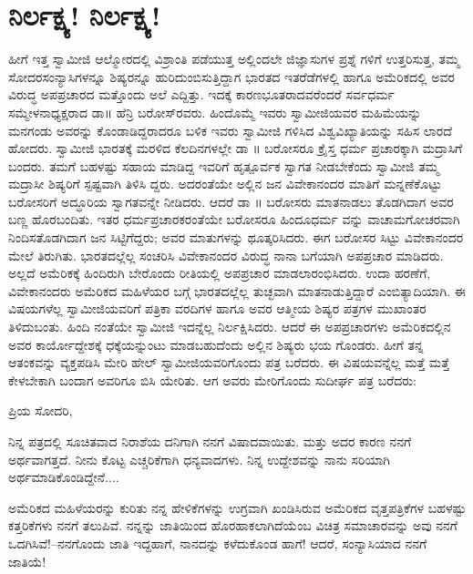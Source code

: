 
\chapter{ನಿರ್ಲಕ್ಷ್ಯ! ನಿರ್ಲಕ್ಷ್ಯ!}

\noindent

ಹೀಗೆ ಇತ್ತ ಸ್ವಾಮೀಜಿ ಆಲ್ಮೋರದಲ್ಲಿ ವಿಶ್ರಾಂತಿ ಪಡೆಯುತ್ತ ಅಲ್ಲಿಂದಲೇ ಜಿಜ್ಞಾಸುಗಳ ಪ್ರಶ್ನೆ ಗಳಿಗೆ ಉತ್ತರಿಸುತ್ತ, ತಮ್ಮ ಸೋದರಸಂನ್ಯಾಸಿಗಳನ್ನೂ ಶಿಷ್ಯರನ್ನೂ ಹುರಿದುಂಬಿಸುತ್ತಿದ್ದಾಗ ಭಾರತದ ಇತರೆಡೆಗಳಲ್ಲಿ ಹಾಗೂ ಅಮೆರಿಕದಲ್ಲಿ ಅವರ ವಿರುದ್ಧ ಅಪಪ್ರಚಾರದ ಮತ್ತೊಂದು ಅಲೆ ಎದ್ದಿತ್ತು. ಇದಕ್ಕೆ ಕಾರಣಭೂತರಾದವರೆಂದರೆ ಸರ್ವಧರ್ಮ ಸಮ್ಮೇಳನಾಧ್ಯಕ್ಷರಾದ ಡಾ॥ ಹೆನ್ರಿ ಬರೋಸ್​ರವರು. ಹಿಂದೊಮ್ಮೆ ಇವರು ಸ್ವಾಮೀಜಿಯವರ ಮಹಿಮೆಯನ್ನು ಮನಗಂಡು ಅವರನ್ನು ಕೊಂಡಾಡಿದ್ದರಾದರೂ ಬಳಿಕ ಇವರು ಸ್ವಾಮೀಜಿ ಗಳಿಸಿದ ವಿಶ್ವವಿಖ್ಯಾತಿಯನ್ನು ಸಹಿಸ ಲಾರದೆ ಹೋದರು. ಸ್ವಾಮೀಜಿ ಭಾರತಕ್ಕೆ ಮರಳಿದ ಕೆಲದಿನಗಳಲ್ಲೇ ಡಾ ॥ ಬರೋಸರೂ ಕ್ರೈಸ್ತ ಧರ್ಮ ಪ್ರಚಾರಕ್ಕಾಗಿ ಮದ್ರಾಸಿಗೆ ಬಂದರು. ತಮಗೆ ಬಹಳಷ್ಟು ಸಹಾಯ ಮಾಡಿದ್ದ ಇವರಿಗೆ ಹೃತ್ಪೂರ್ವಕ ಸ್ವಾಗತ ನೀಡಬೇಕೆಂದು ಸ್ವಾಮೀಜಿ ತಮ್ಮ ಮದ್ರಾಸೀ ಶಿಷ್ಯರಿಗೆ ಸ್ಪಷ್ಟವಾಗಿ ತಿಳಿಸಿ ದ್ದರು. ಅದರಂತೆಯೇ ಅಲ್ಲಿನ ಜನ ವಿವೇಕಾನಂದರ ಮಾತಿಗೆ ಮನ್ನಣೆಕೊಟ್ಟು ಬರೋಸರಿಗೆ ಅದ್ಧೂರಿಯ ಸ್ವಾಗತವನ್ನೇ ನೀಡಿದರು. ಆದರೆ ಡಾ ॥ ಬರೋಸರು ಮಾತನಾಡಲು ತೊಡಗಿದಾಗ ಅವರ ಬಣ್ಣ ಹೊರಬಂದಿತು. ಇತರ ಧರ್ಮಪ್ರಚಾರಕರಂತೆಯೇ ಬರೋಸರೂ ಹಿಂದೂಧರ್ಮ ವನ್ನು ವಾಚಾಮಗೋಚರವಾಗಿ ನಿಂದಿಸತೊಡಗಿದಾಗ ಜನ ಸಿಟ್ಟಿಗೆದ್ದರು; ಅವರ ಮಾತುಗಳನ್ನು ಥೂತ್ಕರಿಸಿದರು. ಈಗ ಬರೋಸರ ಸಿಟ್ಟು ವಿವೇಕಾನಂದರ ಮೇಲೆ ತಿರುಗಿತು. ಭಾರತದಲ್ಲೆಲ್ಲ ಸಂಚರಿಸಿ ವಿವೇಕಾನಂದರ ವಿರುದ್ಧ ನಾನಾ ಬಗೆಯಾಗಿ ಅಪಪ್ರಚಾರ ಮಾಡಿದರು. ಅಲ್ಲದೆ ಅಮೆರಿಕಕ್ಕೆ ಹಿಂದಿರುಗಿ ಬೇರೊಂದು ರೀತಿಯಲ್ಲಿ ಅಪಪ್ರಚಾರ ಮಾಡಲಾರಂಭಿಸಿದರು. ಉದಾ ಹರಣೆಗೆ, ವಿವೇಕಾನಂದರು ಅಮೆರಿಕದ ಮಹಿಳೆಯರ ಬಗ್ಗೆ ಭಾರತದಲ್ಲೆಲ್ಲ ತುಚ್ಛವಾಗಿ ಮಾತನಾಡುತ್ತಿದ್ದಾರೆ ಎಂಬಿತ್ಯಾದಿಯಾಗಿ. ಈ ವಿಷಯಗಳೆಲ್ಲ ಸ್ವಾಮೀಜಿಯವರಿಗೆ ಪತ್ರಿಕಾ ವರದಿಗಳ ಹಾಗೂ ಅವರ ಆತ್ಮೀಯ ಶಿಷ್ಯರ ಪತ್ರಗಳ ಮುಖಾಂತರ ತಿಳಿದುಬಂತು. ಹಿಂದಿ ನಂತೆಯೇ ಸ್ವಾಮೀಜಿ ಇದನ್ನೆಲ್ಲ ನಿರ್ಲಕ್ಷಿಸಿದರು. ಆದರೆ ಈ ಅಪಪ್ರಚಾರಗಳು ಅಮೆರಿಕದಲ್ಲಿನ ಅವರ ಕಾರ್ಯೋದ್ದೇಶಕ್ಕೆ ಧಕ್ಕೆಯನ್ನುಂಟು ಮಾಡಬಹುದೆಂದು ಅಲ್ಲಿನ ಶಿಷ್ಯರು ಭಯ ಗೊಂಡರು. ಹೀಗೆ ತನ್ನ ಆತಂಕವನ್ನು ವ್ಯಕ್ತಪಡಿಸಿ ಮೇರಿ ಹೇಲ್ ಸ್ವಾಮೀಜಿಯವರಿಗೊಂದು ಪತ್ರ ಬರೆದರು. ಈ ವಿಷಯವನ್ನೆಲ್ಲ ಮತ್ತೆ ಮತ್ತೆ ಕೇಳಬೇಕಾಗಿ ಬಂದಾಗ ಅವರಿಗೂ ಬಿಸಿ ಯೇರಿತು. ಆಗ ಅವರು ಮೇರಿಗೊಂದು ಸುದೀರ್ಘ ಪತ್ರ ಬರೆದರು:

\noindent

ಪ್ರಿಯ ಸೋದರಿ,

ನಿನ್ನ ಪತ್ರದಲ್ಲಿ ಸೂಚಿತವಾದ ನಿರಾಶೆಯ ದನಿಗಾಗಿ ನನಗೆ ವಿಷಾದವಾಯಿತು. ಮತ್ತು ಅದರ ಕಾರಣ ನನಗೆ ಅರ್ಥವಾಗತ್ತದೆ. ನೀನು ಕೊಟ್ಟ ಎಚ್ಚರಿಕೆಗಾಗಿ ಧನ್ಯವಾದಗಳು. ನಿನ್ನ ಉದ್ದೇಶವನ್ನು ನಾನು ಸರಿಯಾಗಿ ಅರ್ಥಮಾಡಿಕೊಂಡಿದ್ದೇನೆ....

ಅಮೆರಿಕದ ಮಹಿಳೆಯರನ್ನು ಕುರಿತು ನನ್ನ ಹೇಳಿಕೆಗಳನ್ನು ಉಗ್ರವಾಗಿ ಖಂಡಿಸಿರುವ ಅಮೆರಿಕದ ವೃತ್ತಪತ್ರಿಕೆಗಳ ಬಹಳಷ್ಟು ಕತ್ತರಿಕೆಗಳು ನನಗೆ ತಲುಪಿವೆ. ನನ್ನನ್ನು ಜಾತಿಯಿಂದ ಹೊರಹಾಕಲಾಗಿದೆಯೆಂಬ ವಿಚಿತ್ರ ಸಮಾಚಾರವನ್ನು ಅವು ನನಗೆ ಒದಗಿಸಿವೆ!–ನನಗೊಂದು ಜಾತಿ ಇದ್ದಹಾಗೆ, ನಾನದನ್ನು ಕಳೆದುಕೊಂಡ ಹಾಗೆ! ಆದರೆ, ಸಂನ್ಯಾಸಿಯಾದ ನನಗೆ ಜಾತಿಯೆ!

